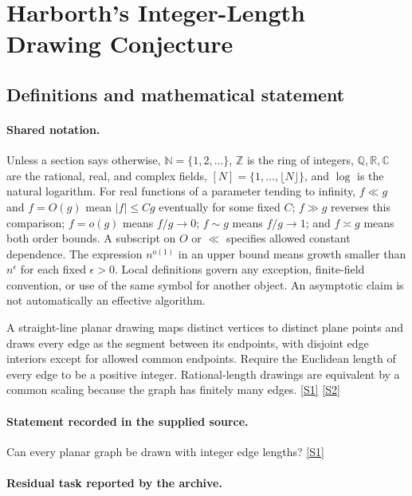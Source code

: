 \documentclass[11pt,a4paper]{article}
\newcommand{\N}{\mathbb{N}}
\newcommand{\Z}{\mathbb{Z}}
\newcommand{\Q}{\mathbb{Q}}
\newcommand{\R}{\mathbb{R}}
\newcommand{\C}{\mathbb{C}}
\newcommand{\sref}[2]{\hyperlink{source:#1:#2}{[S#2]}}
\begin{document}
\section{Harborth’s Integer-Length Drawing Conjecture}\label{statement}


\subsection{Definitions and mathematical statement}

\paragraph{Shared notation.}Unless a section says otherwise, $\N=\{1,2,\ldots\}$,
$\Z$ is the ring of integers, $\Q,\R,\C$ are the rational, real, and complex
fields, $[N]=\{1,\ldots,\lfloor N\rfloor\}$, and $\log$ is the natural
logarithm. For real functions of a parameter tending to infinity,
$f\ll g$ and $f=O(g)$ mean $|f|\leq Cg$ eventually for some fixed $C$;
$f\gg g$ reverses this comparison; $f=o(g)$ means $f/g\to0$;
$f\sim g$ means $f/g\to1$; and $f\asymp g$ means both order bounds.
A subscript on $O$ or $\ll$ specifies allowed constant dependence.
The expression $n^{o(1)}$ in an upper bound means growth smaller than
$n^\epsilon$ for each fixed $\epsilon>0$. Local definitions govern any
exception, finite-field convention, or use of the same symbol for another
object. An asymptotic claim is not automatically an effective algorithm.



A straight-line planar drawing maps distinct vertices to distinct plane points and draws every edge as the segment between its endpoints, with disjoint edge interiors except for allowed common endpoints. Require the Euclidean length of every edge to be a positive integer. Rational-length drawings are equivalent by a common scaling because the graph has finitely many edges. \sref{statement}{1} \sref{statement}{2}

\paragraph{Statement recorded in the supplied source.}
Can every planar graph be drawn with integer edge lengths? \sref{statement}{1}

\paragraph{Residual task reported by the archive.}
\end{document}
